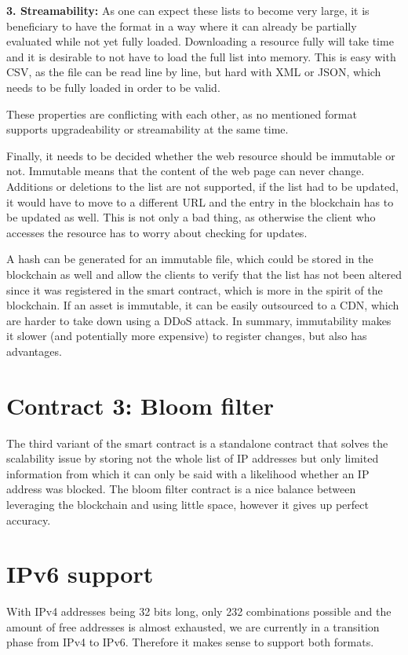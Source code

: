 \textbf{3. Streamability:} As one can expect these lists to become very large, it is beneficiary to have the format in a way where it can already be partially evaluated while not yet fully loaded. Downloading a resource fully will take time and it is desirable to not have to load the full list into memory. This is easy with CSV, as the file can be read line by line, but hard with XML or JSON, which needs to be fully loaded in order to be valid.


These properties are conflicting with each other, as no mentioned format supports upgradeability or streamability at the same time.

Finally, it needs to be decided whether the web resource should be immutable or not. Immutable means that the content of the web page can never change. Additions or deletions to the list are not supported, if the list had to be updated, it would have to move to a different URL and the entry in the blockchain has to be updated as well. This is not only a bad thing, as otherwise the client who accesses the resource has to worry about checking for updates.

A hash can be generated for an immutable file, which could be stored in the blockchain as well and allow the clients to verify that the list has not been altered since it was registered in the smart contract, which is more in the spirit of the blockchain. If an asset is immutable, it can be easily outsourced to a CDN, which are harder to take down using a DDoS attack.
In summary, immutability makes it slower (and potentially more expensive) to register changes, but also has advantages.

\section{Contract 3: Bloom filter}
The third variant of the smart contract is a standalone contract that solves the scalability issue by storing not the whole list of IP addresses but only limited information from which it can only be said with a likelihood whether an IP address was blocked. The bloom filter contract is a nice balance between leveraging the blockchain and using little space, however it gives up perfect accuracy.

\section{IPv6 support}

With IPv4 addresses being 32 bits long, only 232 combinations possible and the amount of free addresses is almost exhausted, we are currently in a transition phase from IPv4 to IPv6. Therefore it makes sense to support both formats.

